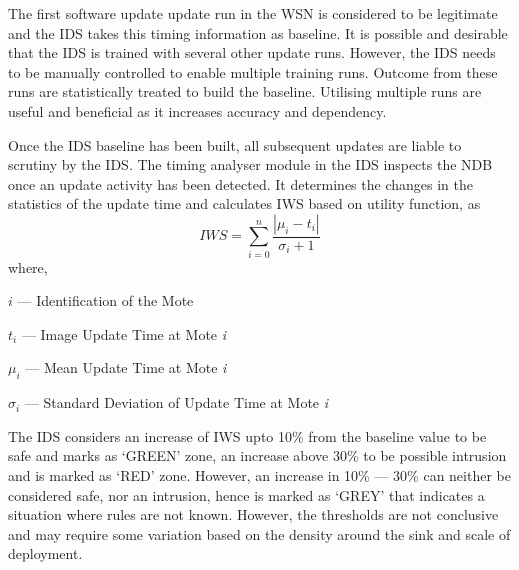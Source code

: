 \documentclass[conference,final]{IEEEtran}
\begin{document}
The first software update update run in the WSN is considered to be legitimate and the IDS takes this timing information as baseline.
It is possible and desirable that the IDS is trained with several other update runs.
However, the IDS needs to be manually controlled to enable multiple training runs.
Outcome from these runs are statistically treated to build the baseline.
Utilising multiple runs are useful and beneficial as it increases accuracy and dependency.

Once the IDS baseline has been built, all subsequent updates are liable to scrutiny by the IDS.
The timing analyser module in the IDS inspects the NDB once an update activity has been detected.
It determines the changes in the statistics of the update time and calculates IWS based on utility function, as
\begin{equation}
\label{eqn2} 
	IWS = \sum \limits_{i=0}^{n} \frac{\left| \mu_i - t_i \right|}{\sigma_i + 1}
\end{equation}
where, 

	\hspace {.2cm} $i$ --- Identification of the Mote  
	
	\hspace {.2cm} $t_i$ --- Image Update Time at Mote \emph{i} 
	
	\hspace {.2cm} $\mu_i$ --- Mean Update Time at Mote \emph{i} 
	
	\hspace {.2cm} $\sigma_i$ --- Standard Deviation of Update Time at Mote \emph{i} 
	
The IDS considers an increase of IWS upto 10\% from the baseline value to be safe and marks as `GREEN' zone, an increase above 30\% to be possible intrusion and is marked as `RED' zone.
However, an increase in 10\% --- 30\% can neither be considered safe, nor an intrusion, hence is marked as `GREY' that indicates a situation where rules are not known.
However, the thresholds are not conclusive and may require some variation based on the density around the sink and scale of deployment.
\end{document}
